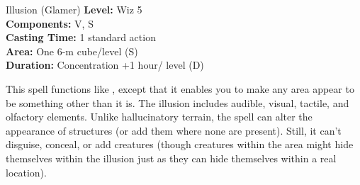 {Illusion (Glamer)}
{
	\textbf{Level:}
	Wiz 5\\
	\textbf{Components:}
	V, S\\
	\textbf{Casting Time:}
	1 standard action\\
	\textbf{Area:}
	One 6-m cube/level (S)\\
	\textbf{Duration:}
	Concentration +1 hour/ level (D)\\
}
{
	This spell functions like , except that it enables you to make any area appear to be something other than it is. The illusion includes audible, visual, tactile, and olfactory elements. Unlike hallucinatory terrain, the spell can alter the appearance of structures (or add them where none are present). Still, it can't disguise, conceal, or add creatures (though creatures within the area might hide themselves within the illusion just as they can hide themselves within a real location).

}
